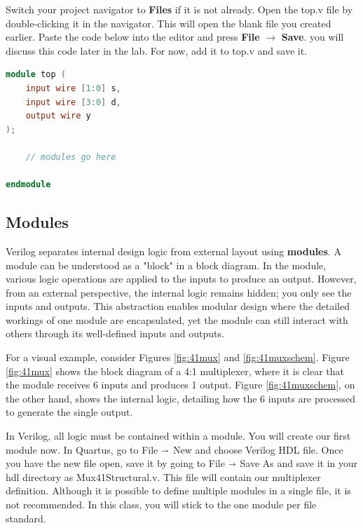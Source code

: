 \documentclass[12pt]{journal}
\begin{document}
Switch your project navigator to \textbf{Files} if it is not already. Open the top.v file by double-clicking it in the navigator. This will open the blank file you created earlier. Paste the code below into the editor and press \textbf{File} $\longrightarrow$ \textbf{Save}. you will discuss this code later in the lab. For now, add it to top.v and save it.

\begin{lstlisting}[language=verilog]
module top (
    input wire [1:0] s,
    input wire [3:0] d,
    output wire y
);

    // modules go here

endmodule
\end{lstlisting}

\subsection{Modules}
Verilog separates internal design logic from external layout using \textbf{modules}. A module can be understood as a "block" in a block diagram. In the module, various logic operations are applied to the inputs to produce an output. However, from an external perspective, the internal logic remains hidden; you only see the inputs and outputs. This abstraction enables modular design where the detailed workings of one module are encapsulated, yet the module can still interact with others through its well-defined inputs and outputs.

For a visual example, consider Figures \ref{fig:41mux} and \ref{fig:41muxschem}. Figure \ref{fig:41mux} shows the block diagram of a 4:1 multiplexer, where it is clear that the module receives 6 inputs and produces 1 output. Figure \ref{fig:41muxschem}, on the other hand, shows the internal logic, detailing how the 6 inputs are processed to generate the single output.

In Verilog, all logic must be contained within a module. You will create our first module now. In Quartus, go to File $\shortrightarrow$ New and choose Verilog HDL file. Once you have the new file open, save it by going to File $\shortrightarrow$ Save As and save it in your hdl directory as Mux41Structural.v. This file will contain our multiplexer definition. Although it is possible to define multiple modules in a single file, it is not recommended. In this class, you will stick to the one module per file standard.
\end{document}
